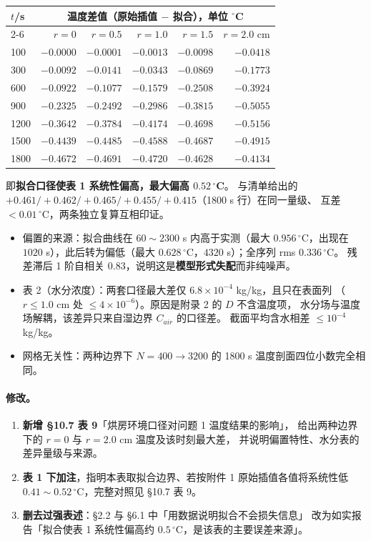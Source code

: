 \documentclass[11pt,a4paper]{ctexart}
\begin{document}
\begin{center}
\small
\begin{tabular}{@{}lrrrrr@{}}
\toprule
$t$/s & \multicolumn{5}{c}{温度差值（原始插值 $-$ 拟合），单位 $^\circ$C} \\
\cmidrule(lr){2-6}
 & $r=0$ & $r=0.5$ & $r=1.0$ & $r=1.5$ & $r=2.0$ cm \\
\midrule
100  & $-0.0000$ & $-0.0001$ & $-0.0013$ & $-0.0098$ & $-0.0418$ \\
300  & $-0.0092$ & $-0.0141$ & $-0.0343$ & $-0.0869$ & $-0.1773$ \\
600  & $-0.0922$ & $-0.1077$ & $-0.1579$ & $-0.2508$ & $-0.3924$ \\
900  & $-0.2325$ & $-0.2492$ & $-0.2986$ & $-0.3815$ & $-0.5055$ \\
1200 & $-0.3642$ & $-0.3784$ & $-0.4174$ & $-0.4698$ & $\mathbf{-0.5156}$ \\
1500 & $-0.4439$ & $-0.4485$ & $-0.4588$ & $-0.4687$ & $-0.4915$ \\
1800 & $-0.4672$ & $-0.4691$ & $-0.4720$ & $-0.4628$ & $-0.4134$ \\
\bottomrule
\end{tabular}
\end{center}

\noindent 即\textbf{拟合口径使表 1 系统性偏高，最大偏高 $0.52\,^\circ$C}。
与清单给出的 $+0.461/+0.462/+0.465/+0.455/+0.415$（1800 s 行）在同一量级、
互差 $<0.01\,^\circ$C，两条独立复算互相印证。

\begin{itemize}[leftmargin=1.6em,itemsep=2pt]
  \item 偏置的来源：拟合曲线在 $60\sim2300$ s 内高于实测（最大 $0.956\,^\circ$C，出现在
  $1020$ s），此后转为偏低（最大 $0.628\,^\circ$C，$4320$ s）；全序列 rms $0.336\,^\circ$C。
  残差滞后 1 阶自相关 $0.83$，说明这是\textbf{模型形式失配}而非纯噪声。
  \item 表 2（水分浓度）：两套口径最大差仅 $6.8\times10^{-4}$ kg/kg，且只在表面列
  （$r\le1.0$ cm 处 $\le4\times10^{-6}$）。原因是附录 2 的 $D$ 不含温度项，
  水分场与温度场解耦，该差异只来自湿边界 $C_{air}$ 的口径差。
  截面平均含水相差 $\le10^{-4}$ kg/kg。
  \item 网格无关性：两种边界下 $N=400\to3200$ 的 1800 s 温度剖面四位小数完全相同。
\end{itemize}

\paragraph{修改。}
\begin{enumerate}[leftmargin=1.8em,itemsep=2pt]
  \item \textbf{新增 §10.7 表 9}「烘房环境口径对问题 1 温度结果的影响」，
  给出两种边界下的 $r=0$ 与 $r=2.0$ cm 温度及该时刻最大差，
  并说明偏置特性、水分表的差异量级与来源。
  \item \textbf{表 1 下加注}，指明本表取拟合边界、若按附件 1 原始插值各值将系统性低
  $0.41\sim0.52\,^\circ$C，完整对照见 §10.7 表 9。
  \item \textbf{删去过强表述}：§2.2 与 §6.1 中「用数据说明拟合不会损失信息」
  改为如实报告「拟合使表 1 系统性偏高约 $0.5\,^\circ$C，是该表的主要误差来源」。
\end{enumerate}
\end{document}
